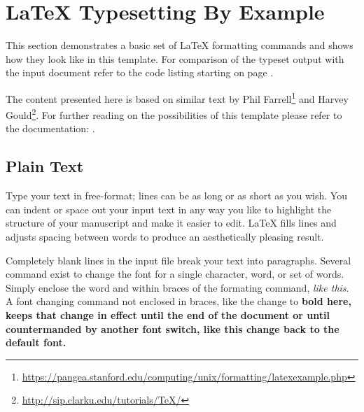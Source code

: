 

%


\section{LaTeX Typesetting By Example}
\label{sec:example:tutorial}
This section demonstrates a basic set of LaTeX formatting commands and shows how they look like in this template. For comparison of the typeset output with the input document refer to the code listing starting on page \pageref{sec:example:code}.

The content presented here is based on similar text by Phil Farrell\footnote{\url{https://pangea.stanford.edu/computing/unix/formatting/latexexample.php}} and Harvey Gould\footnote{\url{http://sip.clarku.edu/tutorials/TeX/}}.
For further reading on the possibilities of this template please refer to the documentation: .

\subsection{Plain Text}
\label{sec:example:PlainText}

Type your text in free-format; lines can be as long
or as short as you wish.
        You can indent         or space out
        your input 
            text in 
                any way you like to highlight the structure
        of your manuscript and make it easier to edit.
LaTeX fills lines and adjusts spacing between words to produce an
aesthetically pleasing result.

Completely blank lines in the input file break your text into
paragraphs.
Several command exist to change the font for a single character, word, or set of words. Simply enclose the word and within braces of the formating command, 
\emph{like this}.
A font changing command not enclosed in braces, like the change to \bfseries 
bold here, keeps that change in effect until the end of the document or
until countermanded by another font switch, like this change back to 
\normalfont the default font. 

